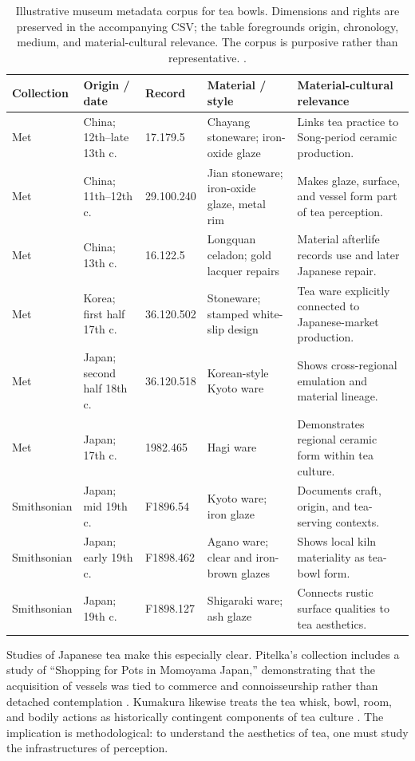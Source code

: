 \documentclass[numbers]{IntechOpen-Book}
\begin{document}
\begin{table}[t]
\centering
\scriptsize
\renewcommand{\arraystretch}{1.08}
\begin{tabularx}{\textwidth}{p{16mm} p{25mm} p{18mm} p{30mm} X}
\toprule
\textbf{Collection} & \textbf{Origin / date} & \textbf{Record} & \textbf{Material / style} & \textbf{Material-cultural relevance}\\
\midrule
Met & China; 12th--late 13th c. & 17.179.5 & Chayang stoneware; iron-oxide glaze & Links tea practice to Song-period ceramic production.\\
Met & China; 11th--12th c. & 29.100.240 & Jian stoneware; iron-oxide glaze, metal rim & Makes glaze, surface, and vessel form part of tea perception.\\
Met & China; 13th c. & 16.122.5 & Longquan celadon; gold lacquer repairs & Material afterlife records use and later Japanese repair.\\
Met & Korea; first half 17th c. & 36.120.502 & Stoneware; stamped white-slip design & Tea ware explicitly connected to Japanese-market production.\\
Met & Japan; second half 18th c. & 36.120.518 & Korean-style Kyoto ware & Shows cross-regional emulation and material lineage.\\
Met & Japan; 17th c. & 1982.465 & Hagi ware & Demonstrates regional ceramic form within tea culture.\\
Smithsonian & Japan; mid 19th c. & F1896.54 & Kyoto ware; iron glaze & Documents craft, origin, and tea-serving contexts.\\
Smithsonian & Japan; early 19th c. & F1898.462 & Agano ware; clear and iron-brown glazes & Shows local kiln materiality as tea-bowl form.\\
Smithsonian & Japan; 19th c. & F1898.127 & Shigaraki ware; ash glaze & Connects rustic surface qualities to tea aesthetics.\\
\bottomrule
\end{tabularx}
\caption{Illustrative museum metadata corpus for tea bowls. Dimensions and rights are preserved in the accompanying CSV; the table foregrounds origin, chronology, medium, and material-cultural relevance. The corpus is purposive rather than representative. \cite{metopenaccess,smithsonianopenaccess}.}
\label{tab:museum-teabowls}
\end{table}

Studies of Japanese tea make this especially clear. Pitelka's collection includes a study of ``Shopping for Pots in Momoyama Japan,'' demonstrating that the acquisition of vessels was tied to commerce and connoisseurship rather than detached contemplation \cite{pitelka}. Kumakura likewise treats the tea whisk, bowl, room, and bodily actions as historically contingent components of tea culture \cite{kumakura}. The implication is methodological: to understand the aesthetics of tea, one must study the infrastructures of perception.
\end{document}
